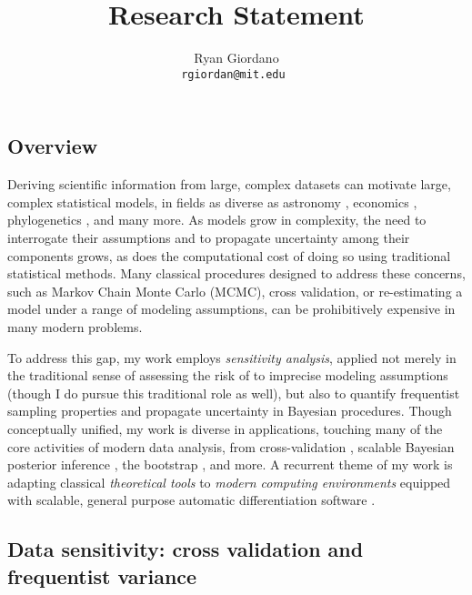 

\title{Research Statement}

\author{
  Ryan Giordano \\ \texttt{rgiordan@mit.edu }
}




\subsection*{Overview}

Deriving scientific information from large, complex datasets can motivate large,
complex statistical models, in fields as diverse as astronomy
\citep{regier:2019:cataloging}, economics \citep{meager:2019:microcredit},
phylogenetics \citep{pritchard:2000:inference}, and many more.  As models grow
in complexity, the need to interrogate their assumptions and to propagate
uncertainty among their components grows, as does the computational
cost of doing so using traditional statistical methods. Many classical
procedures designed to address these concerns, such as Markov Chain Monte Carlo
(MCMC), cross validation, or re-estimating a model under a range of
modeling assumptions, can be prohibitively expensive in many modern problems.

To address this gap, my work employs {\em sensitivity analysis}, applied not
merely in the traditional sense of assessing the risk of to imprecise modeling
assumptions (though I do pursue this traditional role as well), but also to
quantify frequentist sampling properties and propagate uncertainty in Bayesian
procedures. Though conceptually unified, my work is diverse in applications,
touching many of the core activities of modern data analysis, from
cross-validation \citep{giordano:2019:ij, giordano2019:hoij}, scalable Bayesian
posterior inference \citep{giordano:2018:covariances,
giordano:2018:bnpsensitivity}, the bootstrap \citep{giordano:2020:bayesij}, and
more. A recurrent theme of my work is adapting classical {\em theoretical tools}
\citep{reeds:1976:thesis, gustafson:1996:localposterior} to {\em modern
computing environments} equipped with scalable, general purpose automatic
differentiation software \citep{baydin:2015:automatic, carpenter:2015:stanmath}.


\subsection*{Data sensitivity: cross validation and frequentist variance}

